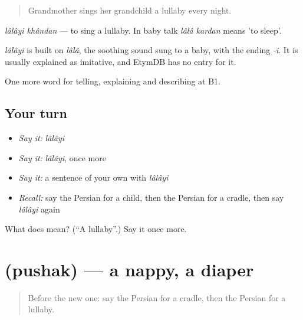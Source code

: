 \begin{quote}
Grandmother sings her grandchild a lullaby every night.
\end{quote}

\emph{lâlâyi khândan} — to sing a lullaby. In baby talk \emph{lâlâ kardan} means 'to sleep'.

\begin{cousinweb}
\emph{lâlâyi} is built on \emph{lâlâ}, the soothing sound sung to a baby, with the ending \emph{-i}. It is usually explained as imitative, and EtymDB has no entry for it.
\end{cousinweb}

\begin{grammarlens}[title={What you've built}]
One more word for telling, explaining and describing at B1.
\end{grammarlens}

\subsection*{Your turn}
\begin{itemize}
\raggedright
  \item \emph{Say it:} \emph{lâlâyi}
  \item \emph{Say it:} \emph{lâlâyi}, once more
  \item \emph{Say it:} a sentence of your own with \emph{lâlâyi}
  \item \emph{Recall:} say the Persian for a child, then the Persian for a cradle, then say \emph{lâlâyi} again
\end{itemize}

\begin{tcolorbox}[breakable,colback=teal!4,colframe=teal!35!black,title={Before you move on}]
What does  mean? (\textquotedblleft{}A lullaby\textquotedblright{}.) Say it once more.
\end{tcolorbox}
\section[\texorpdfstring{\fa{پوشک} (pushak)}{پوشک (pushak)}]{ (pushak) — a nappy, a diaper}

\label{lesson:FA-C502-pushak}



\begin{quote}
Before the new one: say the Persian for a cradle, then the Persian for a lullaby.
\end{quote}

